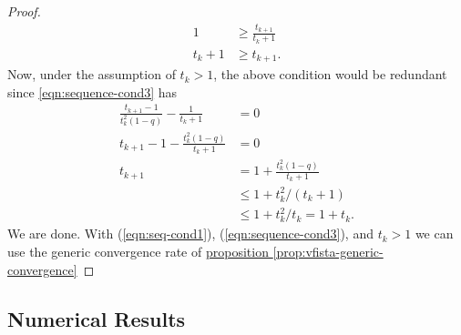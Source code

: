 \begin{proof}
\begin{align*}
            1 &\ge 
            \frac{t_{k + 1}}{t_k + 1}
            \\
            t_k + 1 &\ge t_{k + 1}. 
        \end{align*}
        Now, under the assumption of $t_k > 1$, the above condition would be redundant since \ref*{eqn:sequence-cond3} has 
        \begin{align*}
            \frac{t_{k + 1} - 1}{t_k^2(1 - q)}
            -
            \frac{1}{t_k + 1} &= 0
            \\
            t_{k + 1} - 1 - 
            \frac{t_k^2(1 - q)}{t_k + 1} &= 0
            \\
            t_{k + 1} &= 1 + 
            \frac{t_k^2(1 - q)}{t_k + 1}
            \\
            & \le 1 + t_k^2/(t_k + 1)
            \\
            &\le 1 + t_k^2/t_k = 1 + t_k. 
        \end{align*}
        We are done. 
        With (\ref*{eqn:seq-cond1}), (\ref*{eqn:sequence-cond3}), and $t_k > 1$ we can use the generic convergence rate of \hyperref[prop:vfista-generic-convergence]{proposition \ref*{prop:vfista-generic-convergence}}
    \end{proof}

\subsection{Numerical Results}


